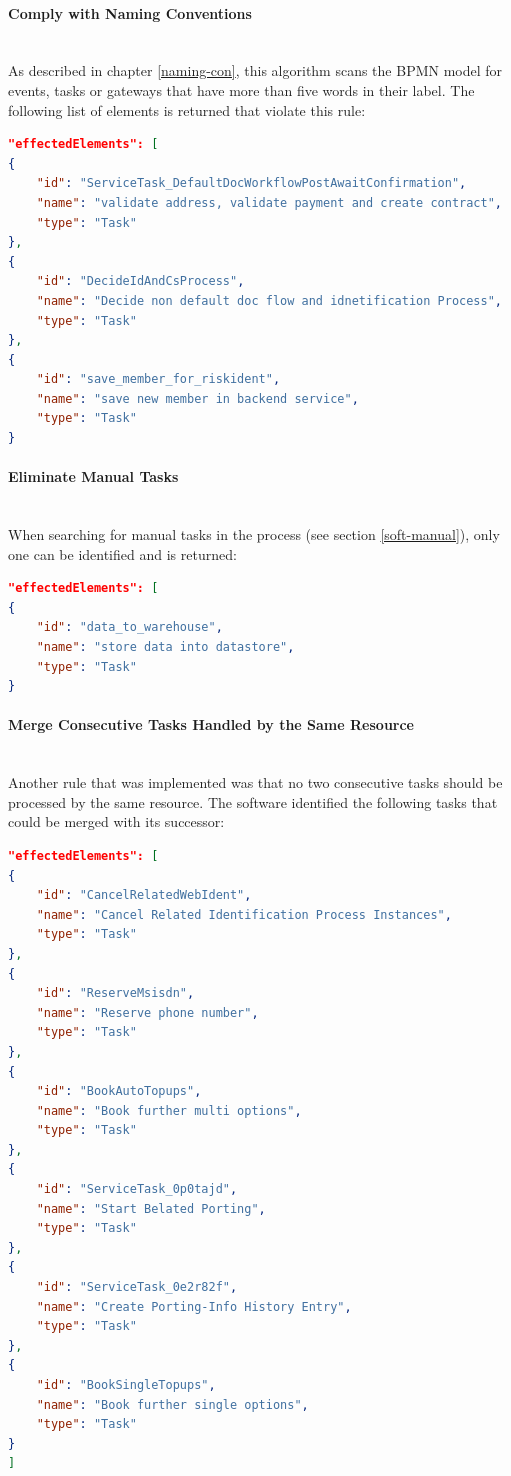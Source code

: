 \paragraph{Comply with Naming Conventions}~\\
As described in chapter \ref{naming-con}, this algorithm scans the BPMN model for events, tasks or gateways that have more than five words in their label. The following list of elements is returned that violate this rule:
\begin{lstlisting}[language=json,label=lst:naming]
"effectedElements": [
{
	"id": "ServiceTask_DefaultDocWorkflowPostAwaitConfirmation",
	"name": "validate address, validate payment and create contract",
	"type": "Task"
},
{
	"id": "DecideIdAndCsProcess",
	"name": "Decide non default doc flow and idnetification Process",
	"type": "Task"
},
{
	"id": "save_member_for_riskident",
	"name": "save new member in backend service",
	"type": "Task"
}
\end{lstlisting}


\paragraph{Eliminate Manual Tasks}~\\
When searching for manual tasks in the process (see section \ref{soft-manual}), only one can be identified and is returned:
\begin{lstlisting}[language=json,label=lst:manual]
"effectedElements": [
{
	"id": "data_to_warehouse",
	"name": "store data into datastore",
	"type": "Task"
}
\end{lstlisting}
\paragraph{Merge Consecutive Tasks Handled by the Same Resource}~\\
Another rule that was implemented was that no two consecutive tasks should be processed by the same resource. The software identified the following tasks that could be merged with its successor:
\begin{lstlisting}[language=json,label=lst:merge]
"effectedElements": [
{
	"id": "CancelRelatedWebIdent",
	"name": "Cancel Related Identification Process Instances",
	"type": "Task"
},
{
	"id": "ReserveMsisdn",
	"name": "Reserve phone number",
	"type": "Task"
},
{
	"id": "BookAutoTopups",
	"name": "Book further multi options",
	"type": "Task"
},
{
	"id": "ServiceTask_0p0tajd",
	"name": "Start Belated Porting",
	"type": "Task"
},
{
	"id": "ServiceTask_0e2r82f",
	"name": "Create Porting-Info History Entry",
	"type": "Task"
},
{
	"id": "BookSingleTopups",
	"name": "Book further single options",
	"type": "Task"
}
]
\end{lstlisting}
